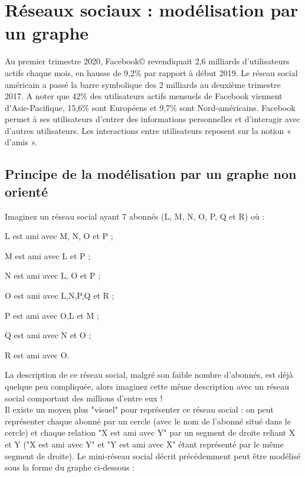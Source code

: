 \documentclass[12pt]{book}
\begin{document}
\section{Réseaux sociaux : modélisation par un graphe
}

Au premier trimestre 2020, Facebook© revendiquait 2,6 milliards d'utilisateurs actifs chaque mois, en hausse de 9,2\% par
rapport à début 2019. Le réseau social américain a passé la barre symbolique des 2 milliards au deuxième trimestre 2017. A
noter que 42\% des utilisateurs actifs mensuels de Facebook viennent d'Asie-Pacifique, 15,6\% sont Européens et 9,7\% sont
Nord-américains. Facebook permet à ses utilisateurs d’entrer des informations personnelles et d’interagir avec
d’autres utilisateurs. Les interactions entre utilisateurs reposent sur la notion « d’amis ».


\subsection{Principe de la modélisation par un graphe non orienté}

Imaginez un réseau social ayant 7 abonnés (L, M, N, O, P, Q et R) où :
\begin{liste}
	\item L est ami avec M, N, O et P ;
	\item M est ami avec L et P ;
	\item N est ami avec L, O et P ;
	\item O est ami avec L,N,P,Q et R ;
	\item P est ami avec O,L et M ;
	\item Q est ami avec N et O ;
	\item R est ami avec O.
\end{liste}

La description de ce réseau social, malgré son faible nombre d'abonnés, est déjà quelque peu compliquée, alors imaginez cette même description avec un réseau social comportant des millions d'entre eux !\\
Il existe un moyen plus "visuel" pour représenter ce réseau social : on peut représenter chaque abonné par un cercle (avec le nom de l'abonné situé dans le cercle) et chaque relation "X est ami avec Y" par un segment de droite reliant X et Y ("X est ami avec Y" et "Y est ami avec X" étant représenté par le même segment de droite).
Le mini-réseau social décrit précédemment peut être modélisé sous la forme du graphe ci-dessous :
\end{document}
